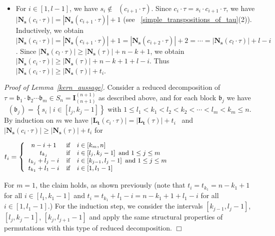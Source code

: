 \documentclass[a4 paper,12pt]{article}
\newcommand{\ger}[1]{\mathfrak{#1}}
\DeclareMathOperator{\Red}{R_{\textbf{d}}}
\begin{document}
\begin{itemize}
	
	\item For  $i\in \left[1,l-1\right]$,  we have  $s_i\not\in \Red(c_{i+1}\cdot \tau)$. Since $c_{i}\cdot  \tau = s_i\cdot c_{i+1}\cdot  \tau$,  we have 
 $\left|\textbf{N}_{\textbf{s}}(c_{i}\cdot  \tau)\right| = \left|\textbf{N}_{\textbf{s}}(c_{i+1}\cdot  \tau)\right| +1$ (see ~\ref{simple_transpositions_of_tau}(2)). Inductively, we obtain  $\left|\textbf{N}_{\textbf{s}}(c_{i}\cdot  \tau)\right| =\left|\textbf{N}_{\textbf{s}}( c_{i+1}\cdot\tau)\right| +1 = \left|\textbf{N}_{\textbf{s}}( c_{i+2}\cdot\tau)\right| +2 = \cdots = \left|\textbf{N}_{\textbf{s}}( c_{l}\cdot\tau)\right| +l-i$. Since  $\left|\textbf{N}_{\textbf{s}}( c_{l}\cdot\tau)\right|\geq \left|\textbf{N}_{\textbf{s}}(\tau)\right|+n-k+1$, we obtain $\left|\textbf{N}_{\textbf{s}}(c_{i}\cdot  \tau)\right| \geq \left|\textbf{N}_{\textbf{s}}(\tau)\right|+n-k+1 +l-i$. Thus $\left|\textbf{N}_{\textbf{s}}(c_{i}\cdot  \tau)\right| \geq \left|\textbf{N}_{\textbf{s}}(\tau)\right|+t_i$.
\end{itemize}







	
	\textit{Proof of Lemma~\ref{kern_aussage}.} Consider a reduced decomposition of  $\tau = \ger{b}_1\cdot \ger{b}_2\cdots \ger{b}_m \in S_n=\textbf{I}_{(n+1)}^{(n+1)}$ as described above, and for each block $\ger{b}_j$ we have  $\Red(\ger{b}_j)=\left\{s_{i} \mid i\in \left[l_{j},   k_{j}-1\right]\right\} $ with $1\leq l_1<k_1<l_2<k_2 <\cdots <l_m<k_m\leq n$. By induction on $m$ we have  $\left|\textbf{L}_{\textbf{t}}(c_{i}\cdot  \tau)\right| =\left|\textbf{L}_{\textbf{t}}( \tau)\right| +t_i$ \  and 
		 $\left|\textbf{N}_{\textbf{s}}(c_{i}\cdot  \tau)\right| \geq \left|\textbf{N}_{\textbf{s}}( \tau)\right| +t_i$ for 
	\begin{center}
	$t_i = \begin{small}\left\{
		\begin{array}{ccl}
	n-i+1 & \textrm{if} & i\in \left[k_m, n\right] \\
		t_{k_j} & \textrm{if} & i\in \left[l_{j}, k_{j}-1\right] \ \textrm{and} \ 1\leq j\leq m \\
		t_{k_j} +l_{j}- i & \textrm{if} & i\in \left[k_{j-1}, l_{j}-1\right]\ \textrm{and} \ 1\leq j\leq m \\
		t_{k_1} +l_{1}- i & \textrm{if} & i\in \left[1, l_{1}-1\right]
	\end{array}\right.\end{small}
	 $
\end{center}
For $m=1$,  the claim holds, as shown previously (note that $t_i = t_{k_1} = n-k_1+1$ for all $i \in [l_1,k_{1}-1]$ and $t_i = t_{k_1} +l_{1}- i  = n-k_1+1  +l_1-i$ for all $i\in \left[1, l_{1}-1\right]$.)  For the induction step, we consider the intervals $\left[k_{j-1}, l_{j}-1\right]$, $\left[l_{j}, k_{j}-1\right]$, $\left[k_{j}, l_{j+1}-1\right]$ and apply the same structural properties of permutations with this type of reduced decomposition.
\hfill $\Box$ 
\end{document}
